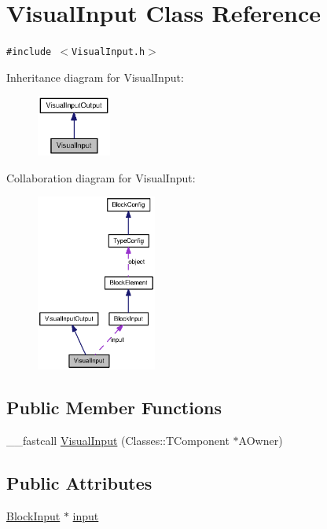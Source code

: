 \hypertarget{classVisualInput}{
\section{VisualInput Class Reference}
\label{classVisualInput}
}
{\tt \#include $<$VisualInput.h$>$}

Inheritance diagram for VisualInput:\nopagebreak
\begin{figure}[H]
\begin{center}
\leavevmode
\includegraphics[width=69pt]{classVisualInput__inherit__graph}
\end{center}
\end{figure}
Collaboration diagram for VisualInput:\nopagebreak
\begin{figure}[H]
\begin{center}
\leavevmode
\includegraphics[width=112pt]{classVisualInput__coll__graph}
\end{center}
\end{figure}
\subsection*{Public Member Functions}
\begin{CompactItemize}
\item 
\_\-\_\-fastcall \hyperlink{classVisualInput_a4321580033604ae3c7b951b8061b8b5}{VisualInput} (Classes::TComponent $\ast$AOwner)
\end{CompactItemize}
\subsection*{Public Attributes}
\begin{CompactItemize}
\item 
\hyperlink{classBlockInput}{BlockInput} $\ast$ \hyperlink{classVisualInput_28567cf4de37faa89c1af357c19677e8}{input}
\end{CompactItemize}


